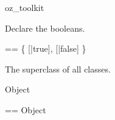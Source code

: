\begin{zsection}
  \SECTION oz\_toolkit
\end{zsection}












Declare the booleans.
\begin{zed}
  \bool == \{ [|true], [|false] \}
\end{zed}

The superclass of all classes.
\begin{class}{Object}
\end{class}

\begin{zed}
  \oid == \poly Object
\end{zed}
